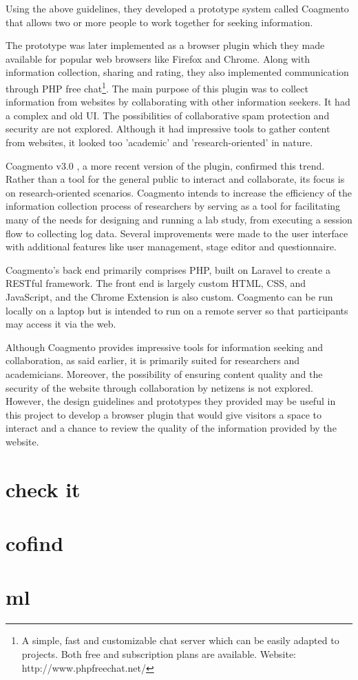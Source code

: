 Using the above guidelines, they developed a prototype system called Coagmento that allows two or more people to work together for seeking information. 

The prototype was later implemented as a browser plugin  \cite{gonzalez-ibanez_coagmento_2011} which they made available for popular web browsers like Firefox and Chrome. Along with information collection, sharing and rating, they also implemented communication through PHP free chat\footnote{A simple, fast and customizable chat server which can be easily adapted to projects. Both free and subscription plans are available. Website: http://www.phpfreechat.net/}. The main purpose of this plugin was to collect information from websites by collaborating with other information seekers. It had a complex and old UI. The possibilities of collaborative spam protection and security are not explored. Although it had impressive tools to gather content from websites, it looked too ’academic’ and ’research-oriented’ in nature.

Coagmento v3.0 \cite{soltani_coagmento_2019}, a more recent version of the plugin, confirmed this trend. Rather than a tool for the general public to interact and collaborate, its focus is on research-oriented scenarios. Coagmento intends to increase the efficiency of the information collection process of researchers by serving as a tool for facilitating many of the needs for designing and running a lab study, from executing a session flow to collecting log data\cite{soltani_coagmento_2019}. Several improvements were made to the user interface with additional features like user management, stage editor and questionnaire.

Coagmento’s back end primarily comprises PHP, built on Laravel to create a RESTful framework. The front end is largely custom HTML, CSS, and JavaScript, and the Chrome Extension is also custom. Coagmento can be run locally on a laptop but is intended to run on a remote server so that participants may access it via the web. 

Although Coagmento provides impressive tools for information seeking and collaboration, as said earlier, it is primarily suited for researchers and academicians. Moreover, the possibility of ensuring content quality and the security of the website through collaboration by netizens is not explored. However, the design guidelines and prototypes they provided may be useful in this project to develop a browser plugin that would give visitors a space to interact and a chance to review the quality of the information provided by the website.


\section{check it}

\section{cofind}

\section{ml}

